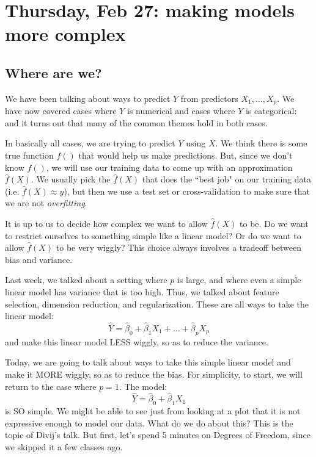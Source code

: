 \section{Thursday, Feb 27: making models more complex}

\subsection{Where are we?}

We have been talking about ways to predict $Y$ from predictors $X_1,\ldots, X_p$. We have now covered cases where $Y$ is numerical and cases where $Y$ is categorical: and it turns out that many of the common themes hold in both cases. 

In basically all cases, we are trying to predict $Y$ using $X$. We think there is some true function $f()$ that would help us make predictions. But, since we don't know $f()$, we will use our training data to come up with an approximation $\hat{f}(X)$. We usually pick the $\hat{f}(X)$ that does the ``best job" on our training data (i.e. $\hat{f}(X) \approx y$), but then we use a test set or cross-validation to make sure that we are not \emph{overfitting}. 

It is up to us to decide how complex we want to allow $\hat{f}(X)$ to be. Do we want to restrict ourselves to something simple like a linear model? Or do we want to allow  $\hat{f}(X)$ to be very wiggly? This choice always involves a tradeoff between bias and variance.

Last week, we talked about a setting where $p$ is large, and where even a simple linear model has variance that is too high. Thus, we talked about feature selection, dimension reduction, and regularization. These are all ways to take the linear model:
$$
\hat{Y} = \hat{\beta}_0 + \hat{\beta}_1 X_1 + \ldots + \hat{\beta}_p X_p
$$
and make this linear model LESS wiggly, so as to reduce the variance.

Today, we are going to talk about ways to take this simple linear model and make it MORE wiggly, so as to reduce the bias. For simplicity, to start, we will return to the case where $p=1$. The model: 
$$
\hat{Y} = \hat{\beta}_0 + \hat{\beta}_1 X_1
$$
is SO simple. We might be able to see just from looking at a plot that it is not expressive enough to model our data. What do we do about this? This is the topic of Divij's talk. But first, let's spend 5 minutes on Degrees of Freedom, since we skipped it a few classes ago. 



